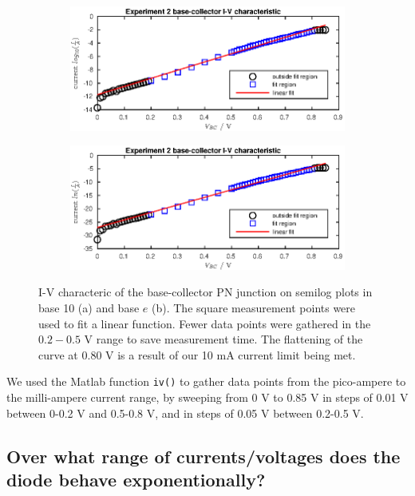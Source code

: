 \begin{figure}
    \center
    \begin{subfigure}{.8\textwidth}
    \center
        \includegraphics[width=\textwidth]{log10ivc.eps}
        \caption{}
    \end{subfigure}
    
    \begin{subfigure}{.8\textwidth}
    \center
        \includegraphics[width=\textwidth]{lnivc.eps}
        \caption{}
    \end{subfigure}
    \caption{I-V characteric of the base-collector PN junction on semilog plots in base 10 (a) and base \(e\) (b). 
    The square measurement points were used to fit a linear function. Fewer data points were gathered in the \(0.2-0.5\) V
range to save measurement time. The flattening of the curve at \(0.80\) V is a result of our 10 mA current limit being met.}
\label{fig:ivclog}
\end{figure}

We used the Matlab function \texttt{iv()} to gather data points from the pico-ampere to the milli-ampere current range, 
by sweeping from 0 V to 0.85 V in steps of 0.01 V between 0-0.2 V and 0.5-0.8 V, and in steps of 0.05 V between 0.2-0.5 V.

\subsection{Over what range of currents/voltages does the diode behave exponentionally?}

